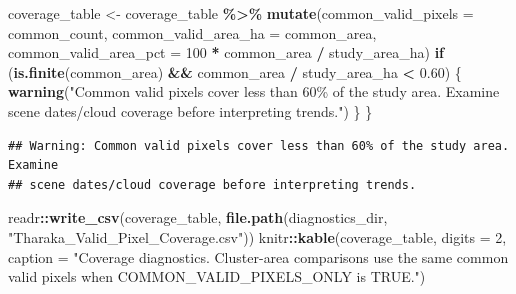 \documentclass[
]{article}
\newenvironment{Shaded}{\begin{snugshade}}{\end{snugshade}}
\newcommand{\AttributeTok}[1]{\textcolor[rgb]{0.13,0.29,0.53}{#1}}
\newcommand{\ControlFlowTok}[1]{\textcolor[rgb]{0.13,0.29,0.53}{\textbf{#1}}}
\newcommand{\DecValTok}[1]{\textcolor[rgb]{0.00,0.00,0.81}{#1}}
\newcommand{\FloatTok}[1]{\textcolor[rgb]{0.00,0.00,0.81}{#1}}
\newcommand{\FunctionTok}[1]{\textcolor[rgb]{0.13,0.29,0.53}{\textbf{#1}}}
\newcommand{\NormalTok}[1]{#1}
\newcommand{\OtherTok}[1]{\textcolor[rgb]{0.56,0.35,0.01}{#1}}
\newcommand{\SpecialCharTok}[1]{\textcolor[rgb]{0.81,0.36,0.00}{\textbf{#1}}}
\newcommand{\StringTok}[1]{\textcolor[rgb]{0.31,0.60,0.02}{#1}}
\begin{document}
\begin{Shaded}
\begin{Highlighting}[]
\NormalTok{  coverage\_table }\OtherTok{\textless{}{-}}\NormalTok{ coverage\_table }\SpecialCharTok{\%\textgreater{}\%} \FunctionTok{mutate}\NormalTok{(}\AttributeTok{common\_valid\_pixels =}\NormalTok{ common\_count,}
    \AttributeTok{common\_valid\_area\_ha =}\NormalTok{ common\_area,}
    \AttributeTok{common\_valid\_area\_pct =} \DecValTok{100} \SpecialCharTok{*}\NormalTok{ common\_area }\SpecialCharTok{/}\NormalTok{ study\_area\_ha)}
  \ControlFlowTok{if}\NormalTok{ (}\FunctionTok{is.finite}\NormalTok{(common\_area) }\SpecialCharTok{\&\&}\NormalTok{ common\_area }\SpecialCharTok{/}\NormalTok{ study\_area\_ha }\SpecialCharTok{\textless{}} \FloatTok{0.60}\NormalTok{) \{}
    \FunctionTok{warning}\NormalTok{(}\StringTok{"Common valid pixels cover less than 60\% of the study area. Examine scene dates/cloud coverage before interpreting trends."}\NormalTok{)}
\NormalTok{  \}}
\NormalTok{\}}
\end{Highlighting}
\end{Shaded}

\begin{verbatim}
## Warning: Common valid pixels cover less than 60% of the study area. Examine
## scene dates/cloud coverage before interpreting trends.
\end{verbatim}

\begin{Shaded}
\begin{Highlighting}[]
\NormalTok{readr}\SpecialCharTok{::}\FunctionTok{write\_csv}\NormalTok{(coverage\_table, }\FunctionTok{file.path}\NormalTok{(diagnostics\_dir, }\StringTok{"Tharaka\_Valid\_Pixel\_Coverage.csv"}\NormalTok{))}
\NormalTok{knitr}\SpecialCharTok{::}\FunctionTok{kable}\NormalTok{(coverage\_table, }\AttributeTok{digits =} \DecValTok{2}\NormalTok{, }\AttributeTok{caption =} \StringTok{"Coverage diagnostics. Cluster{-}area comparisons use the same common valid pixels when COMMON\_VALID\_PIXELS\_ONLY is TRUE."}\NormalTok{)}
\end{Highlighting}
\end{Shaded}
\end{document}
